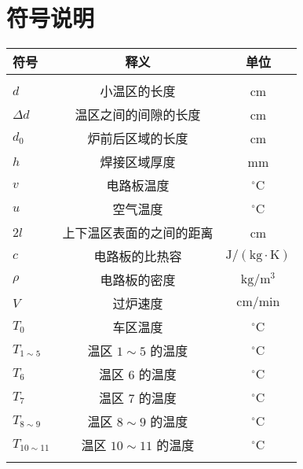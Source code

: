 \section{符号说明}
\begin{table}[H]
\centering
\begin{tabular}{lcc}\hline
符号				&释义					&单位\\ \hline
\\[-1em]
\(d\)				&小温区的长度 & cm\\
\(\Delta d\)&温区之间的间隙的长度 & cm \\
\(d_{0}\)		&炉前后区域的长度 & cm\\
\(h\)				&焊接区域厚度 & mm\\
\(v\)				&电路板温度 & \({}^{\circ}\mathrm{C}\)\\
\(u\)				&空气温度 &\({}^{\circ}\mathrm{C}\)\\
\(2l\)			&上下温区表面的之间的距离 & cm\\
\(c\)				&电路板的比热容 & \(\mathrm{J}/(\mathrm{kg}\cdot \mathrm{K})\)\\
\(\rho\)		&电路板的密度 & \(\mathrm{kg}/\mathrm{m}^{3}\)\\
\(V\)				&过炉速度 & \(\mathrm{cm}/\mathrm{min}\)\\
\(T_{0}\)		&车区温度 & \({}^{\circ}\mathrm{C}\)\\
\(T_{1\sim 5}\)&温区 \(1 \sim 5\) 的温度 & \({}^{\circ}\mathrm{C}\)\\
\(T_{6}\)		&温区 \(6\) 的温度 & \({}^{\circ}\mathrm{C}\)\\
\(T_{7}\)		&温区 \(7\) 的温度 & \({}^{\circ}\mathrm{C}\)\\
\(T_{8\sim 9}\)&温区 \(8 \sim 9\) 的温度 & \({}^{\circ}\mathrm{C}\)\\
\(T_{10\sim 11}\)&温区 \(10 \sim 11\) 的温度 & \({}^{\circ}\mathrm{C}\)\\[-1em]
\\ \hline
\end{tabular}
\end{table}
